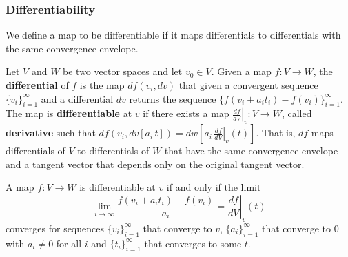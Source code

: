 \iffalse

\begin{prop}
	Let $\{v_i\}_{i=1}^{\infty}$ be a directionally convergent sequence with tangent vector $v$ and rate of convergence $\{a_i\}_{i=1}^{\infty}$. Let $\{b_i\}_{i=1}^{\infty}$ be a convergence envelope that converges at the same rate of $\{a_i\}_{i=1}^{\infty}$. Then $\{v_i\}_{i=1}^{\infty}$ is also a directionally convergent sequence with tangent vector $v$ and rate of convergence $\{b_i\}_{i=1}^{\infty}$.
\end{prop}

\begin{proof}
	Note that 
	$$ \lim\limits_{i \to \infty} \frac{v_i}{b_i} = \lim\limits_{i \to \infty} \frac{v_i}{a_i}\frac{a_i}{b_i} = \lim\limits_{i \to \infty} \frac{v_i}{a_i} \lim\limits_{i \to \infty} \frac{a_i}{b_i} = \lim\limits_{i \to \infty} \frac{v_i}{a_i}.$$
	Therefore all convergence envelopes that converge at the same rate will yield the same results.
\end{proof}

\fi

\subsubsection{Differentiability}

We define a map to be differentiable if it maps differentials to differentials with the same convergence envelope.

\begin{defn}
	Let $V$ and $W$ be two vector spaces and let $v_0 \in V$. Given a map $f: V \to W$, the \textbf{differential} of $f$ is the map $df(v_i, dv)$ that given a convergent sequence $\{v_i\}_{i=1}^{\infty}$ and a differential $dv$ returns the sequence $\{f(v_i + a_i t_i) - f(v_i)\}_{i=1}^{\infty}$. The map is \textbf{differentiable} at $v$ if there exists a map $\left.\frac{df}{dV} \right|_{v}: V \to W$, called \textbf{derivative} such that $df(v_i, dv[a_i \, t]) = dw[a_i \, \left.\frac{df}{dV} \right|_{v} (t)]$. That is, $df$ maps differentials of $V$ to differentials of $W$ that have the same convergence envelope and a tangent vector that depends only on the original tangent vector.
\end{defn}

\begin{prop}
	A map $f : V \to W$ is differentiable at $v$ if and only if the limit
	$$ \lim\limits_{i \to \infty} \frac{f(v_i + a_i t_i) - f(v_i)}{a_i} = \left.\frac{df}{dV} \right|_{v} (t)$$
	converges for sequences $\{v_i\}_{i=1}^{\infty}$ that converge to $v$, $\{a_i\}_{i=1}^{\infty}$ that converge to $0$ with $a_i \neq 0$ for all $i$ and $\{t_i\}_{i=1}^{\infty}$ that converges to some $t$.
\end{prop}

